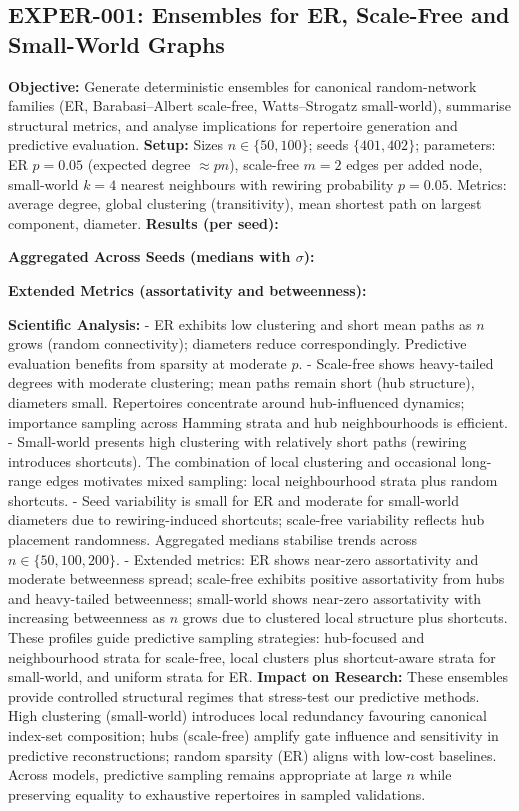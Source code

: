 \subsection{EXPER-001: Ensembles for ER, Scale-Free and Small-World Graphs}
\textbf{Objective:} Generate deterministic ensembles for canonical random-network families (ER, Barabasi–Albert scale-free, Watts–Strogatz small-world), summarise structural metrics, and analyse implications for repertoire generation and predictive evaluation.
\textbf{Setup:} Sizes $n\in\{50,100\}$; seeds $\{401,402\}$; parameters: ER $p=0.05$ (expected degree $\approx pn$), scale-free $m=2$ edges per added node, small-world $k=4$ nearest neighbours with rewiring probability $p=0.05$. Metrics: average degree, global clustering (transitivity), mean shortest path on largest component, diameter.
\textbf{Results (per seed):}
\begin{center}
\end{center}
\textbf{Aggregated Across Seeds (medians with $\sigma$):}
\begin{center}
\end{center}
\textbf{Extended Metrics (assortativity and betweenness):}
\begin{center}
\end{center}
\textbf{Scientific Analysis:}
- ER exhibits low clustering and short mean paths as $n$ grows (random connectivity); diameters reduce correspondingly. Predictive evaluation benefits from sparsity at moderate $p$.
- Scale-free shows heavy-tailed degrees with moderate clustering; mean paths remain short (hub structure), diameters small. Repertoires concentrate around hub-influenced dynamics; importance sampling across Hamming strata and hub neighbourhoods is efficient.
- Small-world presents high clustering with relatively short paths (rewiring introduces shortcuts). The combination of local clustering and occasional long-range edges motivates mixed sampling: local neighbourhood strata plus random shortcuts.
- Seed variability is small for ER and moderate for small-world diameters due to rewiring-induced shortcuts; scale-free variability reflects hub placement randomness. Aggregated medians stabilise trends across $n\in\{50,100,200\}$.
 - Extended metrics: ER shows near-zero assortativity and moderate betweenness spread; scale-free exhibits positive assortativity from hubs and heavy-tailed betweenness; small-world shows near-zero assortativity with increasing betweenness as $n$ grows due to clustered local structure plus shortcuts. These profiles guide predictive sampling strategies: hub-focused and neighbourhood strata for scale-free, local clusters plus shortcut-aware strata for small-world, and uniform strata for ER.
\textbf{Impact on Research:} These ensembles provide controlled structural regimes that stress-test our predictive methods. High clustering (small-world) introduces local redundancy favouring canonical index-set composition; hubs (scale-free) amplify gate influence and sensitivity in predictive reconstructions; random sparsity (ER) aligns with low-cost baselines. Across models, predictive sampling remains appropriate at large $n$ while preserving equality to exhaustive repertoires in sampled validations.

